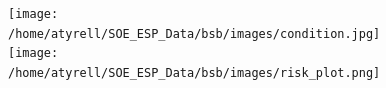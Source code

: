 \documentclass[
  10pt,
  letterpaper,
  DIV=11,
  numbers=noendperiod]{scrartcl}
\begin{document}
\begin{figure}
\begin{minipage}[t]{0.57\linewidth}
{}

\end{minipage}%
%
\begin{minipage}[t]{0.03\linewidth}

{\centering 

}

\end{minipage}%
%
\begin{minipage}[t]{0.40\linewidth}

{\centering 

\hfill

}

\end{minipage}%
\newline
\begin{minipage}[t]{0.57\linewidth}

{\centering 

\texttt{[image: /home/atyrell/SOE\_ESP\_Data/bsb/images/condition.jpg]}
\texttt{[image: /home/atyrell/SOE\_ESP\_Data/bsb/images/risk\_plot.png]}

}

\end{minipage}%

\end{figure}

\newpage

\BgThispage
\end{document}
